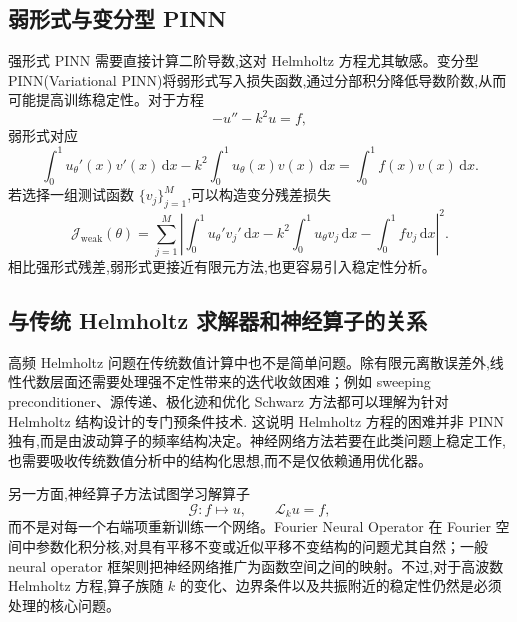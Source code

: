 \documentclass[12pt,hyperref,a4paper,UTF8,twoside]{ctexart}
\newcommand{\dd}{\mathrm d}
\newcommand{\calL}{\mathcal L}
\newcommand{\calJ}{\mathcal J}
\begin{document}
\subsection{弱形式与变分型 PINN}

强形式 PINN 需要直接计算二阶导数,这对 Helmholtz 方程尤其敏感。变分型 PINN(Variational PINN)将弱形式写入损失函数\cite{kharazmi2019variational},通过分部积分降低导数阶数,从而可能提高训练稳定性。对于方程
\begin{equation}\label{eq:weak-helmholtz-repeat}
    -u''-k^2u=f,
\end{equation}
弱形式对应
\begin{equation}\label{eq:weak-loss-basis}
    \int_0^1 u_\theta'(x)v'(x)\,\dd x-k^2\int_0^1u_\theta(x)v(x)\,\dd x
    =\int_0^1f(x)v(x)\,\dd x.
\end{equation}
若选择一组测试函数 $\{v_j\}_{j=1}^M$,可以构造变分残差损失
\begin{equation}\label{eq:vpinn-loss}
    \calJ_{\mathrm{weak}}(\theta)
    =\sum_{j=1}^M
    \left|
    \int_0^1 u_\theta'v_j'\,\dd x-k^2\int_0^1u_\theta v_j\,\dd x-
    \int_0^1fv_j\,\dd x
    \right|^2.
\end{equation}
相比强形式残差,弱形式更接近有限元方法,也更容易引入稳定性分析。

\subsection{与传统 Helmholtz 求解器和神经算子的关系}

高频 Helmholtz 问题在传统数值计算中也不是简单问题。除有限元离散误差外,线性代数层面还需要处理强不定性带来的迭代收敛困难；例如 sweeping preconditioner、源传递、极化迹和优化 Schwarz 方法都可以理解为针对 Helmholtz 结构设计的专门预条件技术\cite{gander2019class}. 这说明 Helmholtz 方程的困难并非 PINN 独有,而是由波动算子的频率结构决定。神经网络方法若要在此类问题上稳定工作,也需要吸收传统数值分析中的结构化思想,而不是仅依赖通用优化器。

另一方面,神经算子方法试图学习解算子
\begin{equation}\label{eq:operator-learning}
    \mathcal G: f\mapsto u,\qquad \calL_k u=f,
\end{equation}
而不是对每一个右端项重新训练一个网络。Fourier Neural Operator 在 Fourier 空间中参数化积分核,对具有平移不变或近似平移不变结构的问题尤其自然\cite{li2021fourier}；一般 neural operator 框架则把神经网络推广为函数空间之间的映射\cite{kovachki2023neural}。不过,对于高波数 Helmholtz 方程,算子族随 $k$ 的变化、边界条件以及共振附近的稳定性仍然是必须处理的核心问题。
\end{document}
